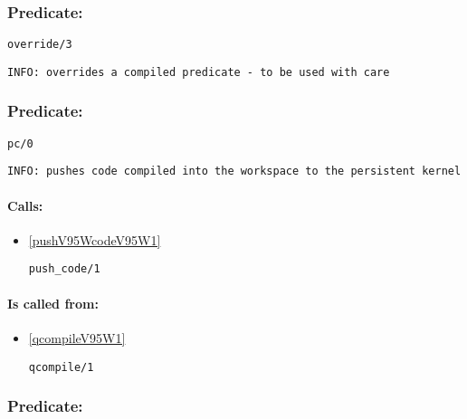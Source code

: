\subsubsection{Predicate:} \label{overrideV95W3}

\begin{verbatim}
override/3
\end{verbatim}

{\small \begin{verbatim}
INFO: overrides a compiled predicate - to be used with care

\end{verbatim}}

\subsubsection{Predicate:} \label{pcV95W0}

\begin{verbatim}
pc/0
\end{verbatim}

{\small \begin{verbatim}
INFO: pushes code compiled into the workspace to the persistent kernel

\end{verbatim}}
\paragraph{Calls:} 
\begin{itemize}
\item \ref{pushV95WcodeV95W1} 
\begin{verbatim}
push_code/1
\end{verbatim}

\end{itemize}
\paragraph{Is called from:} 
\begin{itemize}
\item \ref{qcompileV95W1} 
\begin{verbatim}
qcompile/1
\end{verbatim}

\end{itemize}

\subsubsection{Predicate:} \label{pcloseV95W1}

